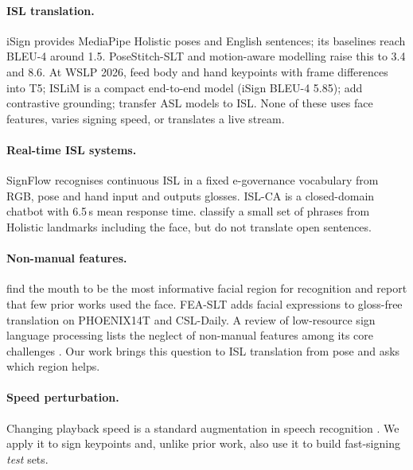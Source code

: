 \documentclass[11pt]{article}
\begin{document}
\paragraph{ISL translation.} iSign \citep{joshi2024isign} provides MediaPipe Holistic poses and
English sentences; its baselines reach BLEU-4 around 1.5. PoseStitch-SLT \citep{posestitch2025} and
motion-aware modelling \citep{roychowdhury2025motion} raise this to 3.4 and 8.6. At WSLP 2026,
\citet{dhamecha2026temporal} feed body and hand keypoints with frame differences into T5;
ISLiM \citep{ahmed2026islim} is a compact end-to-end model (iSign BLEU-4 5.85);
\citet{shrestha2026contrastive} add contrastive grounding; \citet{elaswad2026articulator} transfer ASL
models to ISL. None of these uses face features, varies signing speed, or translates a live stream.

\paragraph{Real-time ISL systems.} SignFlow \citep{geetha2025signflow} recognises continuous ISL in a
fixed e-governance vocabulary from RGB, pose and hand input and outputs glosses. ISL-CA
\citep{nedungadi2025islca} is a closed-domain chatbot with 6.5\,s mean response time.
\citet{srivastava2024continuous} classify a small set of phrases from Holistic landmarks including the
face, but do not translate open sentences.

\paragraph{Non-manual features.} \citet{pham2025facial} find the mouth to be the most informative facial
region for recognition and report that few prior works used the face. FEA-SLT \citep{tu2026feaslt}
adds facial expressions to gloss-free translation on PHOENIX14T and CSL-Daily. A review of low-resource
sign language processing lists the neglect of non-manual features among its core challenges
\citep{lowresource2026review}. Our work brings this question to ISL translation from pose and asks
which region helps.

\paragraph{Speed perturbation.} Changing playback speed is a standard augmentation in speech recognition
\citep{ko2015audio}. We apply it to sign keypoints and, unlike prior work, also use it to build
fast-signing \emph{test} sets.
\end{document}
